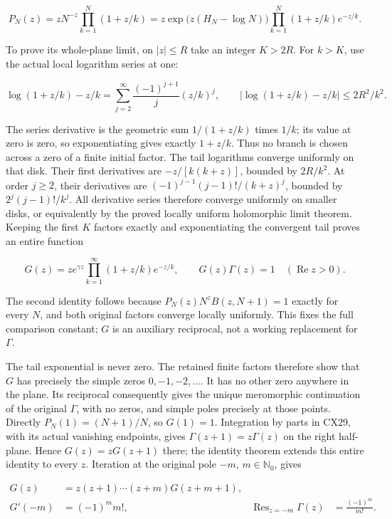 \documentclass[
  11pt,
]{article}
\begin{document}
\[
P_N(z)=zN^{-z}\prod_{k=1}^N(1+z/k)
 =z\exp\bigl(z(H_N-\log N)\bigr)
              \prod_{k=1}^N(1+z/k)e^{-z/k}.
\tag{CX32}
\]

To prove its whole-plane limit, on \(|z|\leq R\) take an integer
\(K>2R\). For \(k>K\), use the actual local logarithm series at one:

\[
\log(1+z/k)-z/k
 =\sum_{j=2}^\infty\frac{(-1)^{j+1}}j(z/k)^j,\qquad
|\log(1+z/k)-z/k|\leq 2R^2/k^2 .
\tag{CX33}
\]

The series derivative is the geometric sum \(1/(1+z/k)\) times \(1/k\);
its value at zero is zero, so exponentiating gives exactly \(1+z/k\).
Thus no branch is chosen across a zero of a finite initial factor. The
tail logarithms converge uniformly on that disk. Their first derivatives
are \(-z/[k(k+z)]\), bounded by \(2R/k^2\). At order \(j\geq2\), their
derivatives are \((-1)^{j-1}(j-1)!/(k+z)^j\), bounded by
\(2^j(j-1)!/k^j\). All derivative series therefore converge uniformly on
smaller disks, or equivalently by the proved locally uniform holomorphic
limit theorem. Keeping the first \(K\) factors exactly and
exponentiating the convergent tail proves an entire function

\[
G(z)=z e^{\gamma z}\prod_{k=1}^\infty(1+z/k)e^{-z/k},
\qquad G(z)\Gamma(z)=1\quad(\operatorname{Re}z>0).
\tag{CX34}
\]

The second identity follows because \(P_N(z)N^zB(z,N+1)=1\) exactly for
every \(N\), and both original factors converge locally uniformly. This
fixes the full comparison constant; \(G\) is an auxiliary reciprocal,
not a working replacement for \(\Gamma\).

The tail exponential is never zero. The retained finite factors
therefore show that \(G\) has precisely the simple zeros
\(0,-1,-2,\ldots\). It has no other zero anywhere in the plane. Its
reciprocal consequently gives the unique meromorphic continuation of the
original \(\Gamma\), with no zeros, and simple poles precisely at those
points. Directly \(P_N(1)=(N+1)/N\), so \(G(1)=1\). Integration by parts
in CX29, with its actual vanishing endpoints, gives
\(\Gamma(z+1)=z\Gamma(z)\) on the right half-plane. Hence
\(G(z)=zG(z+1)\) there; the identity theorem extends this entire
identity to every \(z\). Iteration at the original pole \(-m\),
\(m\in\mathbb N_0\), gives

\[
\begin{aligned}
G(z)&=z(z+1)\cdots(z+m)G(z+m+1),\\
G'(-m)&=(-1)^m m!,&
\operatorname{Res}_{z=-m}\Gamma(z)&=\frac{(-1)^m}{m!}.
\end{aligned}
\tag{CX35}
\]
\end{document}
